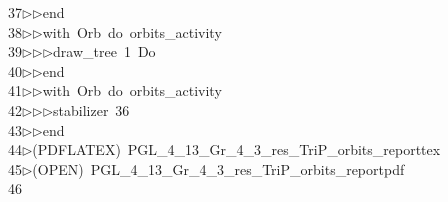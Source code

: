 \begin{tabbing}
37\>$\triangleright$\>$\triangleright$\>end\ \\[0pt]
38\>$\triangleright$\>$\triangleright$\>with\ Orb\ do\ orbits\_activity\ \\[0pt]
39\>$\triangleright$\>$\triangleright$\>$\triangleright$\>draw\_tree\ 1\ Do\ \\[0pt]
40\>$\triangleright$\>$\triangleright$\>end\ \\[0pt]
41\>$\triangleright$\>$\triangleright$\>with\ Orb\ do\ orbits\_activity\ \\[0pt]
42\>$\triangleright$\>$\triangleright$\>$\triangleright$\>stabilizer\ 36\ \\[0pt]
43\>$\triangleright$\>$\triangleright$\>end\\[0pt]
44\>$\triangleright$\>(PDFLATEX)\ PGL\_4\_13\_Gr\_4\_3\_res\_TriP\_orbits\_reporttex\\[0pt]
45\>$\triangleright$\>(OPEN)\ PGL\_4\_13\_Gr\_4\_3\_res\_TriP\_orbits\_reportpdf\\[0pt]
46\>\end{tabbing}
